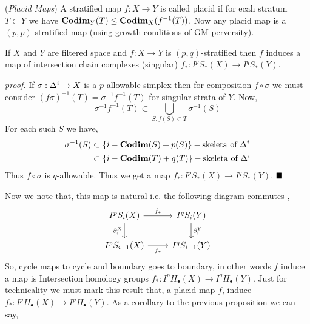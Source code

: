 \documentclass[11pt]{article}
\begin{document}
\vspace*{0.2cm}

\noindent {} (\textit{Placid Maps}) A stratified map $f : X \to Y$ is called placid if for ecah stratum $T\subset Y$ we have $\mathbf{Codim}_Y(T) \leq\mathbf{Codim}_X(f^{-1}(T))$. Now any placid map is a $(p,p)$-stratified map (using growth conditions of GM perversity).

\vspace*{0.2cm}

 If $X$ and $Y$ are filtered space and $f : X \to Y$ is $(p,q)$-stratified then $f$ induces a map of intersection chain complexes (singular) $f_{\ast} : I^pS_{\ast}(X) \to I^qS_{\ast}(Y)$. 

\vspace*{0.2cm}

\noindent \textit{proof.} If $\sigma : \Delta^i \to X$ is a $p$-allowable simplex then for composition $f \circ \sigma$ we must consider $(f\sigma)^{-1}(T) = \sigma^{-1}f^{-1}(T)$ for singular strata of $Y$. Now, \[\sigma^{-1}f^{-1}(T) \subset \bigcup_{S : f(S)\subset T}\sigma^{-1}(S)\] For each such $S$ we have, \begin{align*}
    \sigma^{-1}(S) & \subset \qty{i - \mathbf{Codim}(S) + p(S)}-\text{skeleta of } \Delta^i \\
    & \subset \qty{i - \mathbf{Codim}(T) + q(T)}-\text{skeleta of } \Delta^i
\end{align*} Thus $f\circ \sigma$ is $q$-allowable. Thus we get a map $f_{\ast}: I^pS_{\ast}(X) \to I^qS_{\ast}(Y)$. $\hfill \blacksquare$

\vspace*{0.2cm}

\noindent Now we note that, this map is natural i.e. the following diagram commutes , \[\begin{tikzcd}
    {I^pS_i(X)} & {I^qS_i(Y)} \\
    {I^pS_{i-1}(X)} & {I^qS_{i-1}(Y)}
    \arrow["{\p_i^X}"', from=1-1, to=2-1]
    \arrow["{\p_i^Y}", from=1-2, to=2-2]
    \arrow["{f_{\ast}}", from=1-1, to=1-2]
    \arrow["{f_{\ast}}"', from=2-1, to=2-2]
    \end{tikzcd}\] So, cycle maps to cycle and boundary goes to boundary, in other words $f$ induce a map is Intersection homology groups $f_{\ast}: I^pH_{\bullet}(X) \to I^qH_{\bullet}(Y)$. Just for technicality we must mark this result that, a placid  map $f$, induce $f_{\ast}:I^pH_{\bullet}(X) \to I^pH_{\bullet}(Y)$. As a corollary to the previous proposition we can say, 

\end{document}
